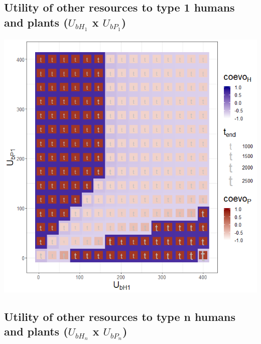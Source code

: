 \documentclass[]{book}
\begin{document}
\newpage

\hypertarget{utility-of-other-resources-to-type-1-humans-and-plants-u_bh_1-x-u_bp_1}{%
\subsection{\texorpdfstring{Utility of other resources to type 1 humans and plants (\(U_{bH_{1}}\) x \(U_{bP_{1}}\))}{Utility of other resources to type 1 humans and plants (U\_\{bH\_\{1\}\} x U\_\{bP\_\{1\}\})}}\label{utility-of-other-resources-to-type-1-humans-and-plants-u_bh_1-x-u_bp_1}}


\includegraphics[width=1\linewidth]{plots/3_twoPar-U.bH1-U.bP1_plot}

\newpage

\hypertarget{utility-of-other-resources-to-type-n-humans-and-plants-u_bh_n-x-u_bp_n}{%
\subsection{\texorpdfstring{Utility of other resources to type n humans and plants (\(U_{bH_{n}}\) x \(U_{bP_{n}}\))}{Utility of other resources to type n humans and plants (U\_\{bH\_\{n\}\} x U\_\{bP\_\{n\}\})}}\label{utility-of-other-resources-to-type-n-humans-and-plants-u_bh_n-x-u_bp_n}}
\end{document}
